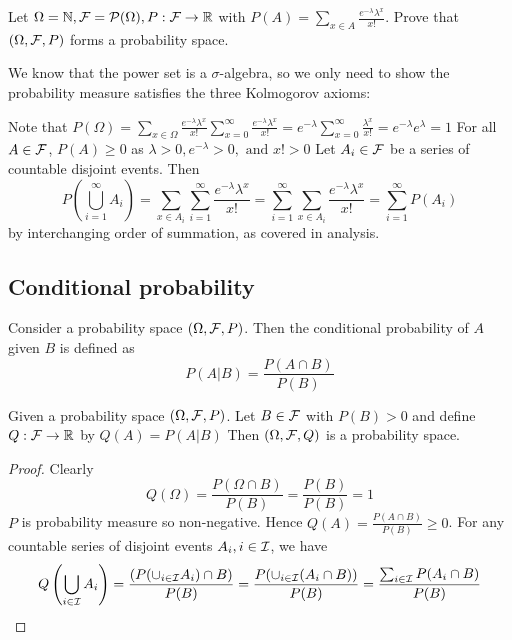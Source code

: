 \documentclass[11pt]{article}
\begin{document}
\begin{exercise}[Poisson]
  Let \(\Omega=\N, \cal{F}=\cal{P}(\Omega), P:\cal{F}\to\R\) with \(P(A)=\sum_{x\in A}\frac{e^{-\lambda}\lambda^x}{x!}\). Prove that \((\Omega,\cal{F},P)\) forms a probability space.
\end{exercise}
\begin{solution}
  We know that the power set is a \(\sigma\)-algebra, so we only need to show the probability measure satisfies the three Kolmogorov axioms:

  \subproof{}
  Note that
  \(P(\Omega)=\sum_{x\in\Omega}\frac{e^{-\lambda}\lambda^x}{x!}\sum_{x=0}^{\infty}\frac{e^{-\lambda}\lambda^x}{x!}=e^{-\lambda}\sum_{x=0}^{\infty}\frac{\lambda^x}{x!}=e^{-\lambda}e^{\lambda}=1\)
  \subproof{}
  For all \(A\in\cal{F}\), \(P(A)\geq 0\) as \(\lambda >0, e^{-\lambda}>0, \text{ and }  x! >0 \)
  \subproof{}
  Let \(A_i\in\cal{F}\) be a series of countable disjoint events. Then
  \[P\left(\bigcup_{i=1}^\infty A_i\right)=\sum_{x\in A_i}\sum_{i=1}^\infty\frac{e^{-\lambda}\lambda^x}{x!}=\sum_{i=1}^\infty\sum_{x\in A_i}\frac{e^{-\lambda}\lambda^x}{x!}=\sum_{i=1}^\infty P(A_i)\]
  by interchanging order of summation, as covered in analysis.
\end{solution}

\subsection{Conditional probability}
\begin{definition}
  Consider a probability space \((\Omega,\cal{F},P)\). Then the conditional probability of \(A\) given \(B\) is defined as
  \[P(A|B)=\frac{P(A\cap B)}{P(B)}\]
\end{definition}

\begin{theorem}
  Given a probability space \((\Omega,\cal{F},P)\). Let \(B\in\cal{F}\) with \(P(B)>0\) and define \(Q:\cal{F}\to\R\) by \(Q(A)=P(A|B)\) Then \((\Omega,\cal{F},Q)\) is a probability space.
\end{theorem}
\begin{proof}
  \subproof{}
  Clearly
  \[Q(\Omega)=\frac{P(\Omega\cap B)}{P(B)}=\frac{P(B)}{P(B)}=1\]
  \subproof{}
  \(P\) is probability measure so non-negative. Hence \(Q(A)=\frac{P(A\cap B)}{P(B)}\geq 0\).
  \subproof{}
  For any countable series of disjoint events \(A_i,i\in\cal{I}\), we have 
  \[Q\left(\bigcup_{i\in\cal{I}}A_i\right)= \frac{(P(\cup_{i\in\cal{I}}A_i)\cap B)}{P(B)} = \frac{P(\cup_{i\in\cal{I}}(A_i \cap B))}{P(B)}=\frac{\sum_{i\in\cal{I}}P(A_i\cap B)}{P(B)}\] 
\end{proof}
\end{document}
